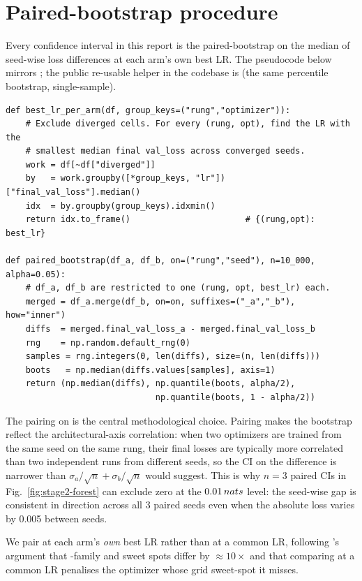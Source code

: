 \section{Paired-bootstrap procedure}\label{app:stats}

Every confidence interval in this report is the paired-bootstrap on the median of seed-wise loss differences at each arm's own best LR. The pseudocode below mirrors ; the public re-usable helper in the codebase is  (the same percentile bootstrap, single-sample).

\begin{verbatim}
def best_lr_per_arm(df, group_keys=("rung","optimizer")):
    # Exclude diverged cells. For every (rung, opt), find the LR with the
    # smallest median final val_loss across converged seeds.
    work = df[~df["diverged"]]
    by   = work.groupby([*group_keys, "lr"])["final_val_loss"].median()
    idx  = by.groupby(group_keys).idxmin()
    return idx.to_frame()                       # {(rung,opt): best_lr}

def paired_bootstrap(df_a, df_b, on=("rung","seed"), n=10_000, alpha=0.05):
    # df_a, df_b are restricted to one (rung, opt, best_lr) each.
    merged = df_a.merge(df_b, on=on, suffixes=("_a","_b"), how="inner")
    diffs  = merged.final_val_loss_a - merged.final_val_loss_b
    rng    = np.random.default_rng(0)
    samples = rng.integers(0, len(diffs), size=(n, len(diffs)))
    boots   = np.median(diffs.values[samples], axis=1)
    return (np.median(diffs), np.quantile(boots, alpha/2),
                              np.quantile(boots, 1 - alpha/2))
\end{verbatim}

The pairing on  is the central methodological choice. Pairing makes the bootstrap reflect the architectural-axis correlation: when two optimizers are trained from the same seed on the same rung, their final losses are typically more correlated than two independent runs from different seeds, so the CI on the difference is narrower than $\sigma_a/\sqrt{n} + \sigma_b/\sqrt{n}$ would suggest. This is why $n=3$ paired CIs in Fig.~\ref{fig:stage2-forest} can exclude zero at the $0.01\,nats$ level: the seed-wise gap is consistent in direction across all 3 paired seeds even when the absolute loss varies by 0.005\nats{} between seeds.

We pair at each arm's \emph{own} best LR rather than at a common LR, following \citet{wen2025fantastic}'s argument that \optMuon-family and \optAdamW{} sweet spots differ by $\approx 10\times$ and that comparing at a common LR penalises the optimizer whose grid sweet-spot it misses.
